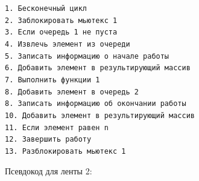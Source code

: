 \documentclass[a4paper,12pt]{article}
\begin{document}
\begin{flushleft}
\texttt{1. Бесконечный цикл\\
2. \hspace{1.5cm} Заблокировать мьютекс 1\\
3. \hspace{1.5cm} Если очередь 1 не пуста\\
4. \hspace{3cm} Извлечь элемент из очереди\\
5. \hspace{3cm} Записать информацию о начале работы\\
6. \hspace{3cm} Добавить элемент в результирующий массив\\
7. \hspace{3cm} Выполнить функции 1\\
8. \hspace{3cm} Добавить элемент в очередь 2\\
8. \hspace{3cm} Записать информацию об окончании работы\\
10. \hspace{3cm} Добавить элемент в результирующий массив\\
11. \hspace{3cm} Если элемент равен n\\
12. \hspace{4.5cm} Завершить работу\\
13. \hspace{1.5cm} Разблокировать мьютекс 1\\
}
\end{flushleft}

Псевдокод для ленты 2:
\end{document}

